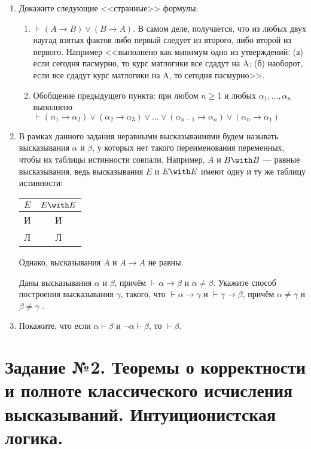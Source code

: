 \documentclass[10pt,a4paper,oneside]{article}
\begin{document}
\begin{enumerate}
\item Докажите следующие <<странные>> формулы:
\begin{enumerate}
\item $\vdash (A \rightarrow B) \vee (B \rightarrow A)$. В самом деле, получается, что из любых двух 
наугад взятых фактов либо первый следует из второго, либо второй из первого. Например <<выполнено как
минимум одно из утверждений: (а) если сегодня пасмурно, то курс матлогики все сдадут на A; (б) наоборот, если все сдадут курс матлогики на A,
то сегодня пасмурно>>.
\item Обобщение предыдущего пункта: при любом $n\ge 1$ и любых $\alpha_1, \dots, \alpha_n$ выполнено 
$\vdash (\alpha_1 \rightarrow \alpha_2) \vee (\alpha_2 \rightarrow \alpha_3) \vee \dots \vee (\alpha_{n-1}\rightarrow\alpha_n)
\vee (\alpha_n\rightarrow\alpha_1)$
\end{enumerate}

\item В рамках данного задания неравными высказываниями будем называть высказывания
$\alpha$ и $\beta$, у которых нет такого переименования переменных, чтобы их
таблицы истинности совпали. Например, $A$ и $B\with B$ --- равные высказывания,
ведь высказывания $E$ и $E\with E$ имеют одну и ту же таблицу истинности:

\begin{center}\begin{tabular}{c|c}
$E$ & $E \with E$\\\hline
И & И\\\hline
Л & Л
\end{tabular}\end{center}

Однако, высказывания $A$ и $A \rightarrow A$ не равны.

Даны высказывания $\alpha$ и $\beta$, причём $\vdash \alpha\rightarrow\beta$ и $\alpha\ne\beta$. 
Укажите способ построения высказывания $\gamma$, такого, что
$\vdash\alpha\rightarrow\gamma$ и $\vdash\gamma\rightarrow\beta$, причём $\alpha\ne\gamma$ и
$\beta\ne\gamma$ .

\item Покажите, что если $\alpha \vdash \beta$ и $\neg\alpha\vdash\beta$, то $\vdash\beta$.
\end{enumerate}

\section*{Задание №2. Теоремы о корректности и полноте классического исчисления высказываний. Интуиционистская логика.}
\end{document}
